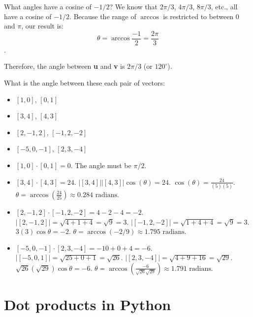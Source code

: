 What angles have a cosine of $-1 / 2$? We know that $2\pi / 3$, $4 \pi / 3$, 
$8 \pi / 3$, etc., all have a cosine of $-1 / 2$. Because the range of 
$\arccos$ is restricted to between $0$ and $\pi$, our result is:
$$\theta = \arccos{ \frac{-1}{2}} = \frac{2\pi}{3}$$.

Therefore, the angle between \textbf{u} and \textbf{v} is $2\pi / 3$ (or $120^{
\circ}$). 

\begin{Exercise}[title={Using dot products}, label=cos_dot_products]
    What is the angle between these each pair of vectors:
    \begin{itemize}
        \item $[1, 0]$, $[0, 1]$
        \item $[3,4]$, $[4,3]$
        \item $[ 2, -1, 2 ]$, $[-1, 2, -2 ]$
        \item $[-5, 0, -1]$, $[2, 3, -4]$
    \end{itemize}
\end{Exercise}
\begin{Answer}[ref=cos_dot_products]
        \begin{itemize}
            \item $[1,0] \cdot [0,1] = 0$.  The angle must be $\pi/2$.
            \item $[3,4] \cdot [4, 3] = 24$. $|[3,4]| |[4,3]| \cos(\theta) = 24$. 
            $\cos(\theta) = \frac{24}{(5)(5)}$. $\theta = \arccos(\frac{24}{25}) 
            \approx 0.284 \text{ radians}$.
            \item $[2, -1, 2] \cdot [-1, 2, -2] = 4 - 2 - 4 = -2$. $|[2, -1, 2]| = \sqrt{4 + 1 + 4} = \sqrt{9} = 3$. $|[-1, 2, -2]| = \sqrt{1 + 4 + 4} = \sqrt{9} = 3$. $3(3) \cos{\theta} = -2$. $\theta = \arccos{ (-2 / 9)} \approx 1.795 \text{ radians}$.
            \item $[ -5, 0, -1] \cdot [2, 3, -4] = -10 + 0 + 4 = -6$. $|[-5, 0, 1]| = \sqrt{25 + 0 + 1} = \sqrt{26}$. $|[2, 3, -4]| = \sqrt{4 + 9 + 16} = \sqrt{29}$. $\sqrt{26} (\sqrt{29}) \cos{\theta} = -6$. $\theta = \arccos{(\frac{-6}{\sqrt{26}\sqrt{29}})} \approx 1.791 \text{ radians}$.
        \end{itemize}
\end{Answer}

\section{Dot products in Python}

